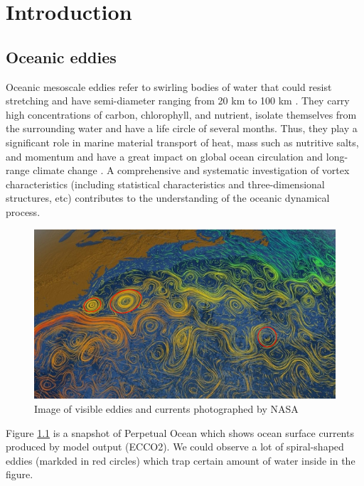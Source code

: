 \chapter{Introduction}\label{sec-introduction}

\section{Oceanic eddies}

Oceanic mesoscale eddies refer to swirling bodies of water that could resist stretching and have semi-diameter ranging from 20 km to 100 km \cite{nencioli2010vector,beron2018enduring}. They carry high concentrations of carbon, chlorophyll, and nutrient, isolate themselves from the surrounding water and have a life circle of several months. Thus, they play a significant role in marine material transport of heat, mass such as nutritive salts, and momentum and have a great impact on global ocean circulation and long-range climate change \cite{mcgillicuddy2007eddy,he2022lagrangian,peacock2013lagrangian,wang2015coherent}. A comprehensive and systematic investigation of vortex characteristics (including statistical characteristics and three-dimensional structures, etc) contributes to the understanding of the oceanic dynamical process.

\begin{figure}[ht]
	
  \centering
  \includegraphics[width=14cm]{chapter/figure/visible eddies and currents in the North Atlantic.png}
  \caption
  {Image of visible eddies and currents photographed by NASA} 
  \label{visible eddies and flow}
\end{figure}


Figure \ref{visible eddies and flow} is a snapshot of Perpetual Ocean which shows ocean surface currents produced by model output (ECCO2). We could observe a lot of spiral-shaped eddies (markded in red circles) which trap certain amount of water inside in the figure.

